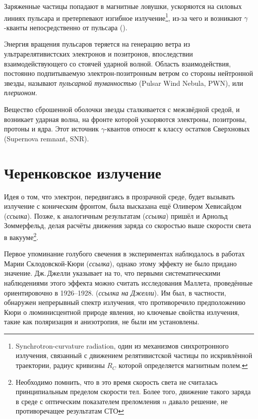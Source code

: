 \documentclass[magd,floatypics,numeref]{msudipl} %
\begin{document}
Заряженные частицы попадают в магнитные ловушки, ускоряются на силовых линиях пульсара и претерпевают изгибное излучение\footnote{Synchrotron-curvature radiation, один из механизмов синхротронного излучения, связанный с движением релятивистской частицы по искривлённой траектории, радиус кривизны $R_C$ которой определяется магнитным полем.}, из-за чего и возникают $\gamma$-кванты непосредственно от пульсара (\autocite{doi:10.1126/science.1164718}). 

Энергия вращения пульсаров теряется на генерацию ветра из ультрарелятивистских электронов и позитронов, впоследствии взаимодействующего со стоячей ударной волной. Область взаимодействия, постоянно подпитываемую электрон-позитронным ветром со стороны нейтронной звезды, называют \textit{пульсарной туманностью} (Pulsar Wind Nebula, PWN), или \textit{плерионом}.

Вещество сброшенной оболочки звезды сталкивается с межзвёдной средой, и возникает ударная волна, на фронте которой ускоряются электроны, позитроны, протоны и ядра. Этот источник $\gamma$-квантов относят к классу остатков Сверхновых (Supernova remnant, SNR).

\section{Черенковское излучение}
Идея о том, что электрон, передвигаясь в прозрачной среде, будет вызывать излучение с коническим фронтом, была высказана ещё Оливером Хевисайдом (\textit{ссылка}).
Позже, к аналогичным результатам (\textit{ссылка}) пришёл и Арнольд Зоммерфельд, делая расчёты движения заряда со скоростью выше скорости света в вакууме\footnote{Необходимо помнить, что в это время скорость света не считалась принципиальным пределом скорости тел. Более того, движение такого заряда в среде с оптическим показателем преломления $n$ давало решение, не противоречащее результатам СТО}. 

Первое упоминание голубого свечения в экспериментах наблюдалось в работах Марии Склодовской-Кюри (\textit{ссылка}), однако этому эффекту не было придано значение. Дж.\,Джелли указывает на то, что первыми систематическими наблюдениями этого эффекта можно считать исследования Маллета, проведённые ориентировочно в 1926--1928. (\textit{ссылка на Джелли}). Им был, в частности, обнаружен непрерывный спектр излучения, что противоречило предположению Кюри о люминисцентной природе явления, но ключевые свойства излучения, такие как поляризация и анизотропия, не были им установлены. 
\end{document}
